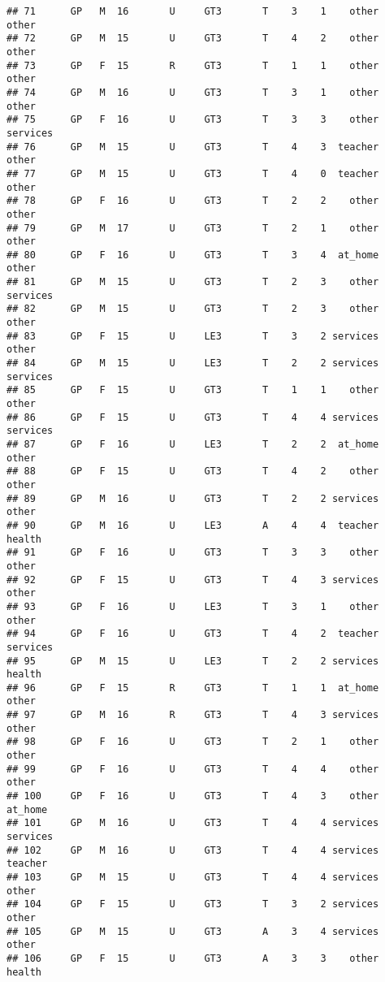 \documentclass[
]{article}
\begin{document}
\begin{verbatim}
## 71      GP   M  16       U     GT3       T    3    1    other    other
## 72      GP   M  15       U     GT3       T    4    2    other    other
## 73      GP   F  15       R     GT3       T    1    1    other    other
## 74      GP   M  16       U     GT3       T    3    1    other    other
## 75      GP   F  16       U     GT3       T    3    3    other services
## 76      GP   M  15       U     GT3       T    4    3  teacher    other
## 77      GP   M  15       U     GT3       T    4    0  teacher    other
## 78      GP   F  16       U     GT3       T    2    2    other    other
## 79      GP   M  17       U     GT3       T    2    1    other    other
## 80      GP   F  16       U     GT3       T    3    4  at_home    other
## 81      GP   M  15       U     GT3       T    2    3    other services
## 82      GP   M  15       U     GT3       T    2    3    other    other
## 83      GP   F  15       U     LE3       T    3    2 services    other
## 84      GP   M  15       U     LE3       T    2    2 services services
## 85      GP   F  15       U     GT3       T    1    1    other    other
## 86      GP   F  15       U     GT3       T    4    4 services services
## 87      GP   F  16       U     LE3       T    2    2  at_home    other
## 88      GP   F  15       U     GT3       T    4    2    other    other
## 89      GP   M  16       U     GT3       T    2    2 services    other
## 90      GP   M  16       U     LE3       A    4    4  teacher   health
## 91      GP   F  16       U     GT3       T    3    3    other    other
## 92      GP   F  15       U     GT3       T    4    3 services    other
## 93      GP   F  16       U     LE3       T    3    1    other    other
## 94      GP   F  16       U     GT3       T    4    2  teacher services
## 95      GP   M  15       U     LE3       T    2    2 services   health
## 96      GP   F  15       R     GT3       T    1    1  at_home    other
## 97      GP   M  16       R     GT3       T    4    3 services    other
## 98      GP   F  16       U     GT3       T    2    1    other    other
## 99      GP   F  16       U     GT3       T    4    4    other    other
## 100     GP   F  16       U     GT3       T    4    3    other  at_home
## 101     GP   M  16       U     GT3       T    4    4 services services
## 102     GP   M  16       U     GT3       T    4    4 services  teacher
## 103     GP   M  15       U     GT3       T    4    4 services    other
## 104     GP   F  15       U     GT3       T    3    2 services    other
## 105     GP   M  15       U     GT3       A    3    4 services    other
## 106     GP   F  15       U     GT3       A    3    3    other   health

\end{verbatim}
\end{document}
